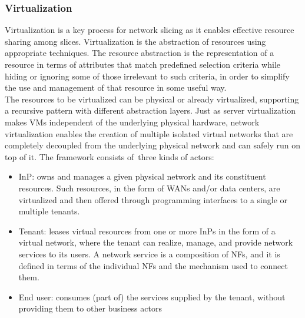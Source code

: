\documentclass{report}
\begin{document}
\subsubsection{Virtualization}
Virtualization is a key process for network slicing
as it enables effective resource sharing among
slices. Virtualization is the abstraction of resources
using appropriate techniques. The resource abstraction is the representation of a resource in terms of
attributes that match predefined selection criteria
while hiding or ignoring some of those irrelevant to such criteria, in order to simplify the
use and management of that resource in some
useful way. \\
The resources to be virtualized can
be physical or already virtualized, supporting a
recursive pattern with different abstraction layers.
Just as server virtualization makes \gls{VM}s independent of the underlying
physical hardware, network virtualization enables
the creation of multiple isolated virtual networks that
are completely decoupled from the underlying physical network and can safely run on top of it.
The framework consists of\ three kinds of actors:
\begin{itemize}
\item \gls{InP}: owns and manages a given physical network and its constituent resources. Such resources, in the form of
WANs and/or data centers, are virtualized and then offered through programming
interfaces to a single or multiple tenants.
\end{itemize}
\begin{itemize}
\item Tenant: leases virtual resources from one or
more InPs in the form of a virtual network,
where the tenant can realize, manage, and
provide network services to its users. A network service is a composition of NFs, and it
is defined in terms of the individual NFs and
the mechanism used to connect them.
\end{itemize}
\begin{itemize}
\item End user: consumes (part of) the services
supplied by the tenant, without providing
them to other business actors
\end{itemize}
\end{document}
